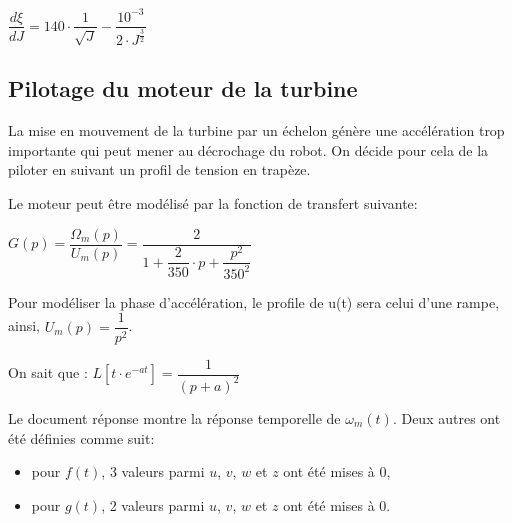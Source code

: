 \begin{center}
$\dfrac{d\xi}{dJ}=140\cdot \dfrac{1}{\sqrt{J}}-\dfrac{10^{-3}}{2\cdot J^{\frac{3}{2}}}$
\end{center}




\subsection{Pilotage du moteur de la turbine}

La mise en mouvement de la turbine par un échelon génère une accélération trop importante qui peut mener au décrochage du robot. On décide pour cela de la piloter en suivant un profil de tension en trapèze.

Le moteur peut être modélisé par la fonction de transfert suivante:
\begin{center}
$G(p)=\dfrac{\Omega_m(p)}{U_m(p)}=\dfrac{2}{1+\dfrac{2}{350}\cdot p+\dfrac{p^2}{350^2}}$
\end{center}

Pour modéliser la phase d'accélération, le profile de u(t) sera celui d'une rampe, ainsi, $U_m(p)=\dfrac{1}{p^2}$.


On sait que : $L[t\cdot e^{-at}]=\dfrac{1}{(p+a)^2}$



Le document réponse montre la réponse temporelle de $\omega_m(t)$. Deux autres ont été définies comme suit:
\begin{itemize}
 \item pour $f(t)$, 3 valeurs parmi $u$, $v$, $w$ et $z$ ont été mises à 0,
 \item pour $g(t)$, 2 valeurs parmi $u$, $v$, $w$ et $z$ ont été mises à 0.
\end{itemize}

